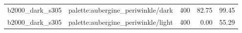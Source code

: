 \begin{longtable}{l>{\raggedright\arraybackslash}p{.42\linewidth}rrr}
b2000\_\allowbreak{}dark\_\allowbreak{}s305 & %
palette:aubergine\_\allowbreak{}periwinkle/dark & %
400 & %
82.75 & %
99.45 \\ %

b2000\_\allowbreak{}dark\_\allowbreak{}s305 & %
palette:aubergine\_\allowbreak{}periwinkle/light & %
400 & %
0.00 & %
55.29 \\ %


\end{longtable}
